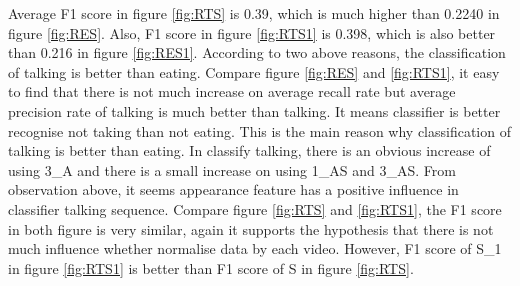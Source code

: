 Average F1 score in figure \ref{fig:RTS} is 0.39, which is much higher than 0.2240 in figure \ref{fig:RES}. Also, F1 score in figure \ref{fig:RTS1} is 0.398, which is also better than 0.216 in figure \ref{fig:RES1}. According to two above reasons, the classification of talking is better than eating. Compare figure \ref{fig:RES} and \ref{fig:RTS1}, it easy to find that there is not much increase on average recall rate but average precision rate of talking is much better than talking. It means classifier is better recognise not taking than not eating. This is the main reason why classification of talking is better than eating. In classify talking, there is an obvious increase of using 3\_A and there is a small increase on using 1\_AS and 3\_AS. From observation above, it seems appearance feature has a positive influence in classifier talking sequence. Compare figure \ref{fig:RTS} and \ref{fig:RTS1}, the F1 score in both figure is very similar, again it supports the hypothesis that there is not much influence whether normalise data by each video. However, F1 score of S\_1 in figure \ref{fig:RTS1} is better than F1 score of S in figure \ref{fig:RTS}.
